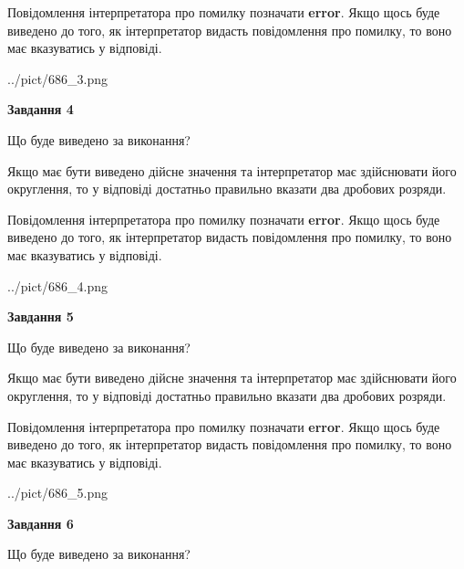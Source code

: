 \documentclass[12pt, ukrainian]{article}
\begin{document}
{\begin {Large}
Повідомлення інтерпретатора про помилку позначати \textbf{error}.
Якщо щось буде виведено до того, як інтерпретатор видасть повідомлення про помилку, 
то воно має вказуватись у відповіді. \par

\begin{center}
	{../pict/686_3.png}
\end{center}
\newpage

{\begin {center}\textbf{Завдання 4}\end {center}}\par
Що буде виведено за виконання? \par

Якщо має бути виведено дійсне значення та інтерпретатор має здійснювати його округлення, 
то у відповіді достатньо правильно вказати два дробових розряди.

Повідомлення інтерпретатора про помилку позначати \textbf{error}.
Якщо щось буде виведено до того, як інтерпретатор видасть повідомлення про помилку, 
то воно має вказуватись у відповіді. \par

\begin{center}
	{../pict/686_4.png}
\end{center}
\newpage

{\begin {center}\textbf{Завдання 5}\end {center}}\par
Що буде виведено за виконання? \par

Якщо має бути виведено дійсне значення та інтерпретатор має здійснювати його округлення, 
то у відповіді достатньо правильно вказати два дробових розряди.

Повідомлення інтерпретатора про помилку позначати \textbf{error}.
Якщо щось буде виведено до того, як інтерпретатор видасть повідомлення про помилку, 
то воно має вказуватись у відповіді. \par

\begin{center}
	{../pict/686_5.png}
\end{center}
\newpage

{\begin {center}\textbf{Завдання 6}\end {center}}\par
Що буде виведено за виконання? \par


\end{Large}}
\end{document}
